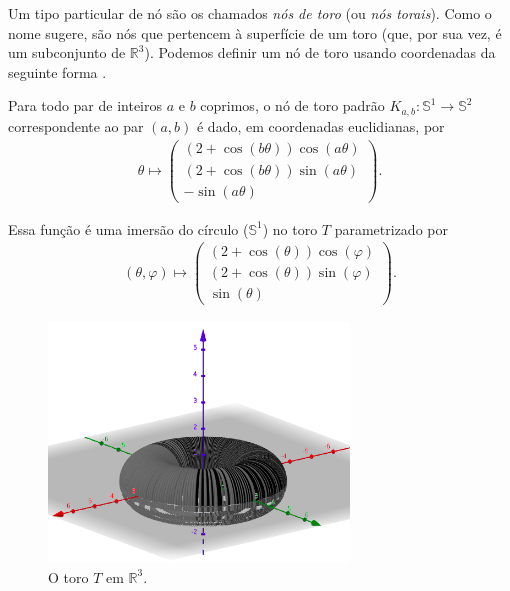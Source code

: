 	\par\vspace{0.3cm} Um tipo particular de nó são os chamados \textit{nós de toro} 
	(ou \textit{nós torais}). Como o nome sugere, são nós que pertencem à superfície 
	de um toro (que, por sua vez, é um subconjunto de $\mathbb{R}^3$). Podemos definir 
	um nó de toro usando coordenadas da seguinte forma \cite{no-toral}.
	\begin{definition}
	\label{def no de toro}
		Para todo par de inteiros $a$ e $b$ coprimos, o nó de toro padrão 
		$K_{a,b}: \mathbb{S}^1\to\mathbb{S}^2$ correspondente ao par $(a,b)$ é dado, em 
		coordenadas euclidianas, por 
		\begin{align*}
    		\theta\mapsto
    		\left( 
    		\begin{matrix}
    		(2+\cos(b\theta))\cos(a\theta) \\
    		(2+\cos(b\theta))\sin(a\theta) \\
    		-\sin(a\theta)
    		\end{matrix} 
    		\right).
		\end{align*}
	\end{definition}
	Essa função é uma imersão do círculo ($\mathbb{S}^1$) no toro $T$ parametrizado por
	\begin{align*}
    	(\theta, \varphi)\mapsto 
    	\left( \begin{matrix}
    	(2+\cos(\theta))\cos(\varphi) \\
    	(2+\cos(\theta))\sin(\varphi) \\
    	\sin(\theta)
    	\end{matrix}  \right).
	\end{align*}
	\begin{figure}[H]
		\begin{center}
			\includegraphics[width=8cm]{Images/toro.png}
		\end{center}\caption{O toro $T$ em $\mathbb{R}^3$.}\label{toro}
	\end{figure}
